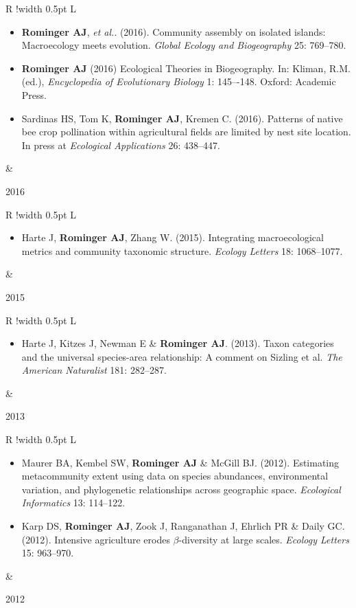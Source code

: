 \documentclass[10pt]{article}
\newcommand\VRule{\color{lightgray}\vrule width 0.5pt}
\newcommand{\cventry}[2]{%
\begin{tabular}[t]{R !{\VRule} L}
  \begin{minipage}[t][][t]{0.81\textwidth}
    #2
  \end{minipage}
  &
  \parbox[t][][t]{0.19\textwidth}{#1}
\end{tabular}%
\vspace{0.25em}
}
\begin{document}
%
\cventry{2016}{
  \begin{itemize}
  \item[]\hspace{-1.1\leftmargin} {\bf Rominger AJ}, {\it et
      al.}. (2016). Community assembly on isolated islands: Macroecology meets
    evolution. {\it Global Ecology and Biogeography} 25: 769--780.
  \item[]\hspace{-1.1\leftmargin} {\bf Rominger AJ} (2016) Ecological Theories in Biogeography. In: Kliman,
    R.M. (ed.), {\it Encyclopedia of Evolutionary Biology} 1:
    145–-148. Oxford: Academic Press.
  \item[]\hspace{-1.1\leftmargin} Sardinas HS, Tom K, {\bf Rominger
      AJ}, Kremen C. (2016). Patterns of native bee crop pollination within
    agricultural fields are limited by nest site location. In press at
    {\it Ecological Applications} 26: 438--447.
  \end{itemize}
}
%
\cventry{2015}{
  \begin{itemize}
  \item[]\hspace{-1.1\leftmargin} Harte J, {\bf Rominger AJ}, Zhang
    W. (2015). Integrating macroecological metrics and community taxonomic
    structure. {\it Ecology Letters} 18: 1068--1077.
  \end{itemize}
}
%
\cventry{2013}{
  \begin{itemize}
  \item[]\hspace{-1.1\leftmargin} Harte J, Kitzes J, Newman E \& {\bf
      Rominger AJ}. (2013). Taxon categories and the universal
    species-area relationship: A comment on Sizling et al.  {\it The
      American Naturalist} 181: 282--287.
  \end{itemize}
}
%
\cventry{2012}{
  \begin{itemize}%
  \item[]\hspace{-1.1\leftmargin} Maurer BA, Kembel SW, {\bf Rominger
      AJ} \& McGill BJ. (2012). Estimating metacommunity extent using
    data on species abundances, environmental variation, and
    phylogenetic relationships across geographic space. {\it
      Ecological Informatics} 13: 114--122.
  \item[]\hspace{-1.1\leftmargin} Karp DS, {\bf Rominger AJ}, Zook J,
    Ranganathan J, Ehrlich PR \& Daily GC. (2012). Intensive
    agriculture erodes $\beta$-diversity
    at large scales. {\it Ecology Letters} 15: 963--970.
  \end{itemize}
}
\end{document}
